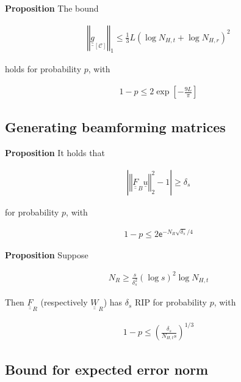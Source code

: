 \documentclass[journal]{IEEEtran}
\renewcommand {\d} {\delta}
\newcommand {\m} [1] {\( #1 \)}
\newcommand {\V} [1] {\underline {#1}}
\newcommand {\M} [1] {\underline {\underline {#1}}}
\newcommand {\RB} [1] {\left( #1 \right)}
\newcommand {\SB} [1] {\left[ #1 \right]}
\newcommand {\Nm} [1] {\left \vert #1 \right \vert}
\newcommand {\VNm} [1] {\left \Vert #1 \right \Vert}
\newcommand {\R} [1] {\sqrt {#1}}
\newcommand {\Disp} [1] {
   \begin {align*}
      #1
   \end {align*}
}
\begin{document}
\textbf {Proposition}
The bound
%
\Disp {
\VNm {\M {g} _{\SB{\mathcal {C}}}} _1
\leq \frac {1} {3} L \RB {\log N_{H,t} + \log N_{H,r}} ^2
}
%
holds for probability \m {p}, with
%
\Disp {
1 -p
\leq 2 \exp \SB {- \frac {9L} {\pi}} 
}


\subsection {Generating beamforming matrices}


\textbf {Proposition}
It holds that
%
\Disp {
\Nm {\VNm {\M {F} _B \V {u}} _2 ^2 - 1}
\geq \d_s 
}
for probability \m {p}, with
\Disp {
1 -p
\leq 2 \mathsf {e} ^{-N_R \R {\d_s} /4} 
}


\textbf {Proposition}
Suppose
\Disp {
N_R
\geq \frac {s} {\d_s^2} \RB {\log s}^2 \log N_{H,t}
}
Then \m {\M {F}_R} (respectively \m {\M {W} _R}) has \m {\d_s} RIP for probability \m {p}, with
\Disp {
1 -p
\leq \RB {\frac {\d_s} {N_{H,t} s}} ^{1/3} 
}



\subsection {Bound for expected error norm}
\end{document}
